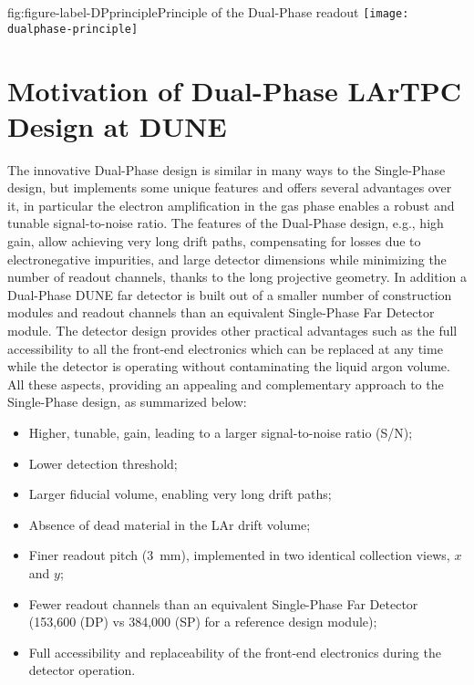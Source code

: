 \begin{dunefigure}{fig:figure-label-DPprinciple}{Principle of the Dual-Phase readout}
\texttt{[image: dualphase-principle]}
\end{dunefigure}

\section{Motivation of Dual-Phase LArTPC Design at DUNE}
\label{sec:fddp-design-motivation}

The innovative Dual-Phase design is similar in many ways to the Single-Phase design, but implements some unique features and offers several advantages over it, in particular the electron amplification in the gas phase enables a robust and tunable signal-to-noise ratio.  The features of the Dual-Phase design, e.g., high gain,  allow achieving very long drift paths, compensating for losses due to electronegative impurities, and large detector dimensions while minimizing the number of readout channels, thanks to the long projective geometry.  In addition a Dual-Phase DUNE far detector is built out of a smaller number of construction modules and readout channels than an equivalent Single-Phase Far Detector module. The detector design provides other practical advantages such as the full accessibility to all the front-end electronics which can be replaced at any time while the detector is operating without contaminating the liquid argon volume. All these aspects, providing an appealing and complementary approach to the Single-Phase design, as summarized below:

\begin{itemize}
\item  Higher, tunable, gain, leading to a larger signal-to-noise ratio (S/N);
\item  Lower detection threshold;
\item  Larger fiducial volume, enabling very long drift paths;
\item  Absence of dead material in the LAr drift volume;
\item  Finer readout pitch (3~mm), implemented in two identical collection views, $x$ and $y$;
\item  Fewer readout channels than an equivalent Single-Phase Far Detector (153,600 (DP) vs 384,000 (SP) for a reference design  module); 
\item  Full accessibility and replaceability of the front-end electronics during the detector operation.
\end{itemize}

